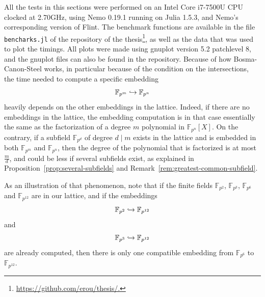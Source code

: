All the tests in this sections were performed on an Intel Core i7-7500U CPU
clocked at 2.70GHz, using Nemo 0.19.1 running on Julia 1.5.3, and
Nemo’s corresponding version of Flint. The benchmark functions are available in the
file \texttt{bencharks.jl} of the repository of the
thesis\footnote{\url{https://github.com/erou/thesis/.}}, as well as the data
that was used to plot the timings. All plots were made using gnuplot version 5.2
patchlevel 8, and the gnuplot files can also be found in the repository. Because
of how Bosma-Canon-Steel works, in particular because of the condition on the
intersections, the time needed to compute a specific embedding
\[
  \mathbb{F}_{p^{m}}\hookrightarrow\mathbb{F}_{p^{n}}
\]
heavily depends on the other embeddings in the lattice. Indeed, if there are no
embeddings in the lattice, the embedding computation is in that case essentially
the same as the factorization of a degree $m$ polynomial in
$\mathbb{F}_{p^{n}}[X]$. On the contrary, if a subfield
$\mathbb{F}_{p^{d}}$ of degree $d\mid m$ exists in the lattice and is embedded
in both $\mathbb{F}_{p^{m}}$ and $\mathbb{F}_{p^{n}}$, then the degree of the
polynomial that is factorized is at most $\frac{m}{d}$, and could be less if
several subfields exist, as explained in
Proposition~\ref{prop:several-subfields} and
Remark~\ref{rem:greatest-common-subfield}.
\begin{figure}[h]
  \centering
\end{figure}
As an illustration of that phenomenon, note that if the finite fields
$\mathbb{F}_{p^{2}}$, $\mathbb{F}_{p^{3}}$, $\mathbb{F}_{p^{6}}$ and
$\mathbb{F}_{p^{12}}$ are in our lattice, and if the embeddings
\[
  \mathbb{F}_{p^{2}}\hookrightarrow \mathbb{F}_{p^{12}}
\]
and
\[
  \mathbb{F}_{p^{3}}\hookrightarrow \mathbb{F}_{p^{12}}
\]
are already computed, then there is only one compatible embedding from
$\mathbb{F}_{p^{6}}$ to $\mathbb{F}_{p^{12}}$.
\begin{figure}[h]
  \centering
\end{figure}
